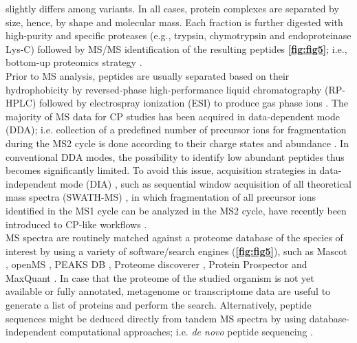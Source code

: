 slightly differs among variants. In all cases, protein complexes are separated by size, hence, by shape and molecular mass. Each fraction is further digested with high-purity and specific proteases (e.g., trypsin, chymotrypsin and endoproteinase Lys-C) followed by MS/MS identification of the resulting peptides \textbf{\autoref{fig:fig5}}; i.e., bottom-up proteomics strategy \cite{Zhang_2013}.\\
Prior to MS analysis, peptides are usually separated based on their hydrophobicity by reversed-phase high-performance liquid chromatography (RP-HPLC) followed by electrospray ionization (ESI) to produce gas phase ions \cite{Zhang_2013}. The majority of MS data for CP studies has been acquired in data-dependent mode (DDA); i.e. collection of a predefined number of precursor ions for fragmentation during the MS2 cycle is done according to their charge states and abundance \cite{Hu_2016}. In conventional DDA modes, the possibility to identify low abundant peptides thus becomes significantly limited. To avoid this issue, acquisition strategies in data-independent mode (DIA) \cite{Krasny_2021}, such as sequential window acquisition of all theoretical mass spectra (SWATH-MS) \cite{Gillet_2012}, in which fragmentation of all precursor ions identified in the MS1 cycle can be analyzed in the MS2 cycle, have recently been introduced to CP-like workflows \cite{Bludau_2020, Calvo_2020, Heusel_2019}.\\ 
MS spectra are routinely matched against a proteome database of the species of interest by using a variety of software/search engines (\textbf{\autoref{fig:fig5}}), such as Mascot \cite{Perkins_1999}, openMS \cite{Rost_2016}, PEAKS DB \cite{Zhang_2012}, Proteome discoverer \cite{Orsburn_2021}, Protein Prospector \cite{Chalkley_2005} and MaxQuant \cite{Tyanova_2016a}. In case that the proteome of the studied organism is not yet available or fully annotated, metagenome or transcriptome data are useful to generate a list of proteins and perform the search. Alternatively, peptide sequences might be deduced directly from tandem MS spectra by using database-independent computational approaches; i.e. \emph{de novo} peptide sequencing \cite{Tran_2017}.\\
